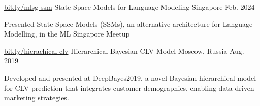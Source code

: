 \begin{cventries}
  \cventry
    {\href{https://bit.ly/mlsg-ssm}{bit.ly/mlsg-ssm}}
    {State Space Models for Language Modeling} %
    {Singapore} %
    {Feb. 2024} %
    {
      \begin{cvitems} %
        \item {Presented State Space Models (SSMs), an alternative architecture for Language Modelling, in the ML Singapore Meetup }
      \end{cvitems}
    }

  \cventry
    {\href{https://bit.ly/attention-image-captioning}{bit.ly/hierachical-clv}}
    {Hierarchical Bayesian CLV Model } %
    {Moscow, Russia} %
    {Aug. 2019} %
    {
      \begin{cvitems} %
        \item {Developed and presented at DeepBayes2019, a novel Bayesian hierarchical model for CLV prediction that integrates customer demographics, enabling data-driven marketing strategies. }
      \end{cvitems}
    }




\end{cventries}
